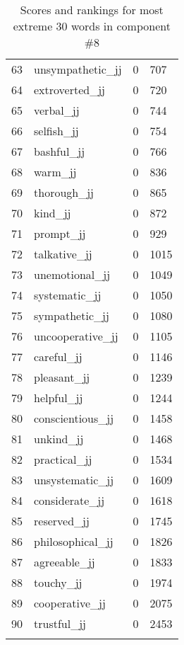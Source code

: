 \begin{longtable}[!htbp]{| rlr@{.}l |}
    63 & unsympathetic\_jj & 0 & 707 \\
    64 & extroverted\_jj & 0 & 720 \\
    65 & verbal\_jj & 0 & 744 \\
    66 & selfish\_jj & 0 & 754 \\
    67 & bashful\_jj & 0 & 766 \\
    68 & warm\_jj & 0 & 836 \\
    69 & thorough\_jj & 0 & 865 \\
    70 & kind\_jj & 0 & 872 \\
    71 & prompt\_jj & 0 & 929 \\
    72 & talkative\_jj & 0 & 1015 \\
    73 & unemotional\_jj & 0 & 1049 \\
    74 & systematic\_jj & 0 & 1050 \\
    75 & sympathetic\_jj & 0 & 1080 \\
    76 & uncooperative\_jj & 0 & 1105 \\
    77 & careful\_jj & 0 & 1146 \\
    78 & pleasant\_jj & 0 & 1239 \\
    79 & helpful\_jj & 0 & 1244 \\
    80 & conscientious\_jj & 0 & 1458 \\
    81 & unkind\_jj & 0 & 1468 \\
    82 & practical\_jj & 0 & 1534 \\
    83 & unsystematic\_jj & 0 & 1609 \\
    84 & considerate\_jj & 0 & 1618 \\
    85 & reserved\_jj & 0 & 1745 \\
    86 & philosophical\_jj & 0 & 1826 \\
    87 & agreeable\_jj & 0 & 1833 \\
    88 & touchy\_jj & 0 & 1974 \\
    89 & cooperative\_jj & 0 & 2075 \\
    90 & trustful\_jj & 0 & 2453 \\
    \hline
    \caption{Scores and rankings for most extreme 30 words in component \#8} \\
\end{longtable}
